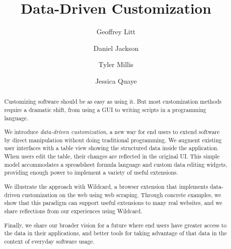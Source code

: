 \documentclass[sigplan,screen,10pt,anonymous,review]{acmart}
\begin{document}
\title{Data-Driven Customization}


\author{Geoffrey Litt}

\author{Daniel Jackson}

\author{Tyler Millis}

\author{Jessica Quaye}


\begin{abstract}
  Customizing software should be as easy as using it. But most
  customization methods require a dramatic shift, from using a GUI to
  writing scripts in a programming language.

  We introduce \emph{data-driven customization}, a new way for end users
  to extend software by direct manipulation without doing traditional
  programming. We augment existing user interfaces with a table view
  showing the structured data inside the application. When users edit
  the table, their changes are reflected in the original UI. This simple
  model accommodates a spreadsheet formula language and custom data
  editing widgets, providing enough power to implement a variety of
  useful extensions.

  We illustrate the approach with Wildcard, a browser extension that
  implements data-driven customization on the web using web scraping.
  Through concrete examples, we show that this paradigm can support
  useful extensions to many real websites, and we share reflections from
  our experiences using Wildcard.

  Finally, we share our broader vision for a future where end users have
  greater access to the data in their applications, and better tools for
  taking advantage of that data in the context of everyday software
  usage.
\end{abstract}
\end{document}
